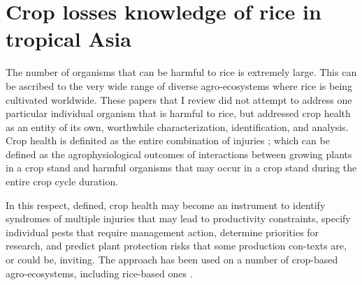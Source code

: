 \section*{Crop losses knowledge of rice in tropical Asia}

The number of organisms that can be harmful to rice is extremely large. This can be ascribed to the very wide range of diverse agro-ecosystems where rice is being cultivated worldwide. These papers that I review did not attempt to address one particular individual organism that is harmful to rice, but addressed crop health as an entity of its own, worthwhile characterization, identification, and analysis. Crop health is definited as the entire combination of injuries \citep{Zadok1985}; which can be defined as the agrophysiological outcomes of interactions between growing plants in a crop stand and harmful organisms that may occur in a crop stand during the entire crop cycle duration. 

In this respect, defined, crop health may become an instrument to identify syndromes of multiple injuries that may lead to productivity constraints, specify individual pests that require management action, determine priorities for research, and predict plant protection risks that some production con-texts are, or could be, inviting. The approach has been used on a number of crop-based agro-ecosystems, including rice-based ones \citep{Savary:2006to}.

